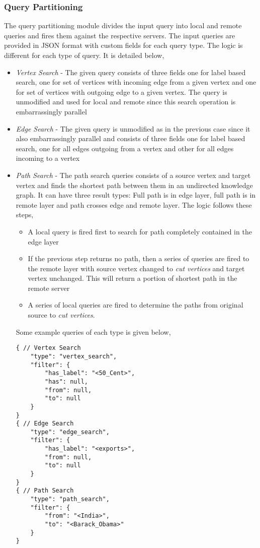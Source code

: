 \documentclass[conference]{IEEEtran}
\begin{document}
\subsubsection{Query Partitioning}
The query partitioning module divides the input query into local and remote queries and fires them against the respective servers. The input queries are provided in JSON format with custom fields for each query type. The logic is different for each type of query. It is detailed below,
\begin{itemize}%
	\item \emph{Vertex Search} - The given query consists of three fields one for label based search, one for set of vertices with incoming edge from a given vertex and one for set of vertices with outgoing edge to a given vertex. The query is unmodified and used for local and remote since this search operation is embarrassingly parallel
	\item \emph{Edge Search} - The given query is unmodified as in the previous case since it also embarrassingly parallel and consists of three fields one for label based search, one for all edges outgoing from a vertex and other for all edges incoming to a vertex
	\item \emph{Path Search} - The path search queries consists of a source vertex and target vertex and finds the shortest path between them in an undirected knowledge graph. It can have three result types: Full path is in edge layer, full path is in remote layer and path crosses edge and remote layer. The logic follows these steps,
	\begin{itemize}
		\item A local query is fired first to search for path completely contained in the edge layer
		\item If the previous step returns no path, then a series of queries are fired to the remote layer with source vertex changed to \emph{cut vertices} and target vertex unchanged. This will return a portion of shortest path in the remote server
		\item A series of local queries are fired to determine the paths from original source to \emph{cut vertices}. 
	\end{itemize}
Some example queries of each type is given below,
\begin{verbatim}
{ // Vertex Search
    "type": "vertex_search",
    "filter": {
        "has_label": "<50_Cent>",
        "has": null,
        "from": null,
        "to": null
    }
}
{ // Edge Search
    "type": "edge_search",
    "filter": {
        "has_label": "<exports>",
        "from": null,
        "to": null
    }
}
{ // Path Search
    "type": "path_search",
    "filter": {
        "from": "<India>",
        "to": "<Barack_Obama>"
    }
}
\end{verbatim}
\end{itemize}
\end{document}
